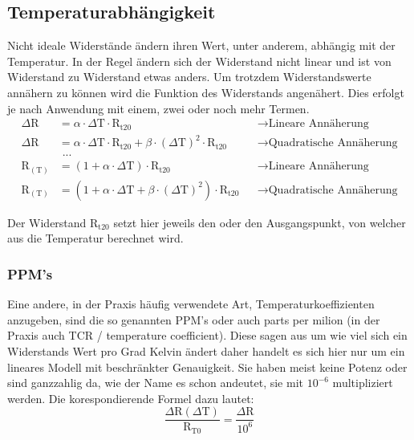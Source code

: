 \subsection{Temperaturabhängigkeit}

Nicht ideale Widerstände ändern ihren Wert, unter anderem, abhängig mit der Temperatur. 
In der Regel ändern sich der Widerstand nicht linear und ist von Widerstand zu Widerstand etwas anders. 
Um trotzdem Widerstandswerte annähern zu können wird die Funktion des Widerstands angenähert. 
Dies erfolgt je nach Anwendung mit einem, zwei oder noch mehr Termen.
\[
\begin{aligned}
    \Delta\text{R}& = \alpha\cdot\Delta\text{T}\cdot\text{R}_\text{t20} &&\rightarrow \text{Lineare Annäherung}\\
    \Delta\text{R}& = \alpha\cdot\Delta\text{T}\cdot\text{R}_\text{t20} + \beta\cdot(\Delta\text{T})^2\cdot\text{R}_\text{t20} &&\rightarrow \text{Quadratische Annäherung}\\
     &\text{ ...} & & \\
    \text{R}_{(\text{T})}& = (1 + \alpha\cdot\Delta\text{T})\cdot\text{R}_\text{t20} &&\rightarrow \text{Lineare Annäherung}\\
    \text{R}_{(\text{T})}& = (1 + \alpha\cdot\Delta\text{T} + \beta\cdot(\Delta\text{T})^2)\cdot\text{R}_\text{t20} &&\rightarrow \text{Quadratische Annäherung}
\end{aligned}
\]

Der Widerstand $\text{R}_\text{t20}$ setzt hier jeweils den  oder den Ausgangspunkt, von welcher aus die Temperatur berechnet wird.

\subsubsection{PPM's}

Eine andere, in der Praxis häufig verwendete Art, Temperaturkoeffizienten anzugeben, sind die so genannten PPM's oder auch parts per milion (in der Praxis auch TCR / temperature coefficient). 
Diese sagen aus um wie viel sich ein Widerstands Wert pro Grad Kelvin ändert daher handelt es sich hier nur um ein lineares Modell mit beschränkter Genauigkeit. 
Sie haben meist keine Potenz oder sind ganzzahlig da, wie der Name es schon andeutet, sie mit $10^{-6}$ multipliziert werden. 
Die korespondierende Formel dazu lautet:\\
\[
    \frac{\Delta\text{R}(\Delta\text{T})}{\text{R}_{\text{T0}}} = \frac{\Delta\text{R}}{10^{6}}
\]
